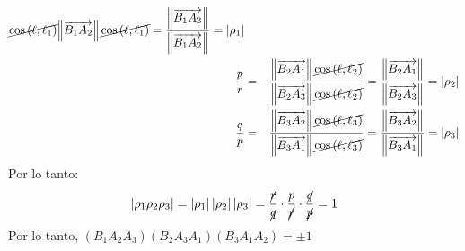 \begin{solucion}
\begin{eqnarray*}
{  \cancel{ \cos\left( \ell, \ell_1 \right) }
  }{
  \left\lVert \overrightarrow{B_1A_2} \right\rVert
  \cancel{ \cos\left( \ell, \ell_1 \right) }
  }
  =
  \frac{
  \left\lVert \overrightarrow{B_1A_3} \right\rVert
  }{
  \left\lVert \overrightarrow{B_1A_2} \right\rVert
  }
  = \lvert \rho_1 \rvert
  \\
  \frac{p}{r} & = &
  \frac{
  \left\lVert \overrightarrow{B_2A_1} \right\rVert
  \cancel{ \cos\left( \ell, \ell_2 \right) }
  }{
  \left\lVert \overrightarrow{B_2A_3} \right\rVert
  \cancel{ \cos\left( \ell, \ell_2 \right) }
  }
  =
  \frac{
  \left\lVert \overrightarrow{B_2A_1} \right\rVert
  }{
  \left\lVert \overrightarrow{B_2A_3} \right\rVert
  }
  = \lvert \rho_2 \rvert
  \\
  \frac{q}{p} & = &
  \frac{
  \left\lVert \overrightarrow{B_3A_2} \right\rVert
  \cancel{ \cos\left( \ell, \ell_3 \right) }
  }{
  \left\lVert \overrightarrow{B_3A_1} \right\rVert
  \cancel{ \cos\left( \ell, \ell_3 \right) }
  }
  =
  \frac{
  \left\lVert \overrightarrow{B_3A_2} \right\rVert
  }{
  \left\lVert \overrightarrow{B_3A_1} \right\rVert
  }
  = \lvert \rho_3 \rvert
 \end{eqnarray*}
 Por lo tanto:
 \begin{equation*}
  \left\lvert \rho_1 \rho_2 \rho_3 \right\rvert
  = 
  \left\lvert \rho_1 \right\rvert
  \left\lvert \rho_2 \right\rvert
  \left\lvert \rho_3 \right\rvert
  = \frac{\cancel{r}}{\cancel{q}} \cdot
  \frac{p}{\cancel{\cancel{r}}} \cdot \frac{\cancel{q}}{\cancel{p}}
  = 1
 \end{equation*}
 Por lo tanto,
 $\left( B_1A_2A_3 \right)\left( B_2A_3A_1 \right)\left( B_3A_1A_2 \right) = \pm 1$
\end{solucion}
